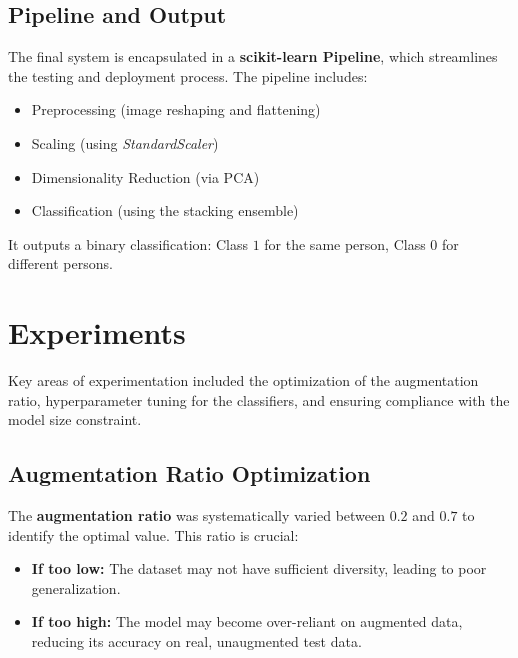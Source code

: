 \documentclass[a4paper]{article}
\begin{document}
\subsection{Pipeline and Output}
The final system is encapsulated in a \textbf{scikit-learn Pipeline}, which streamlines the testing and deployment process. The pipeline includes:
\begin{itemize}
    \item Preprocessing (image reshaping and flattening)
    \item Scaling (using \textit{StandardScaler})
    \item Dimensionality Reduction (via PCA)
    \item Classification (using the stacking ensemble)
\end{itemize}
It outputs a binary classification: Class $1$ for the same person, Class $0$ for different persons.

\section{Experiments}


Key areas of experimentation included the optimization of the augmentation ratio, hyperparameter tuning for the classifiers, and ensuring compliance with the model size constraint.

\subsection{Augmentation Ratio Optimization}
The \textbf{augmentation ratio} was systematically varied between \(0.2\) and \(0.7\) to identify the optimal value. This ratio is crucial:
\begin{itemize}
    \item \textbf{If too low:} The dataset may not have sufficient diversity, leading to poor generalization\cite{aug01}.
    \item \textbf{If too high:} The model may become over-reliant on augmented data, reducing its accuracy on real, unaugmented test data\cite{aug01}.
\end{itemize}
\end{document}
